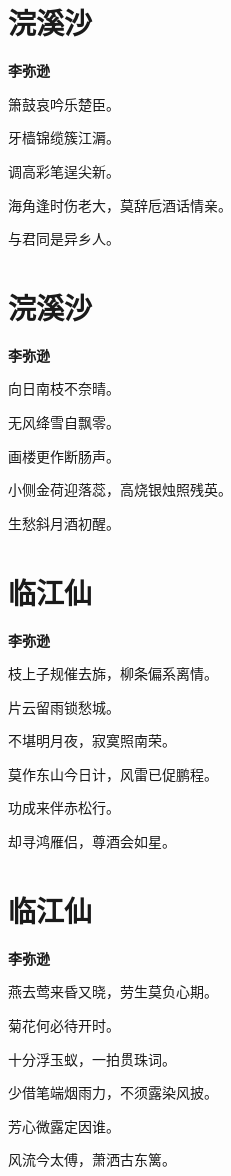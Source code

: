\documentclass[12pt,a4paper]{ctexbook}
\begin{document}
\section{浣溪沙}
\textbf{李弥逊}\par\vspace{0.5em}
箫鼓哀吟乐楚臣。\par
牙樯锦缆簇江漘。\par
调高彩笔逞尖新。\par
海角逢时伤老大，莫辞卮酒话情亲。\par
与君同是异乡人。\par

\section{浣溪沙}
\textbf{李弥逊}\par\vspace{0.5em}
向日南枝不奈晴。\par
无风绛雪自飘零。\par
画楼更作断肠声。\par
小侧金荷迎落蕊，高烧银烛照残英。\par
生愁斜月酒初醒。\par

\section{临江仙}
\textbf{李弥逊}\par\vspace{0.5em}
枝上子规催去旆，柳条偏系离情。\par
片云留雨锁愁城。\par
不堪明月夜，寂寞照南荣。\par
莫作东山今日计，风雷已促鹏程。\par
功成来伴赤松行。\par
却寻鸿雁侣，尊酒会如星。\par

\section{临江仙}
\textbf{李弥逊}\par\vspace{0.5em}
燕去莺来昏又晓，劳生莫负心期。\par
菊花何必待开时。\par
十分浮玉蚁，一拍贯珠词。\par
少借笔端烟雨力，不须露染风披。\par
芳心微露定因谁。\par
风流今太傅，萧洒古东篱。\par
\end{document}

